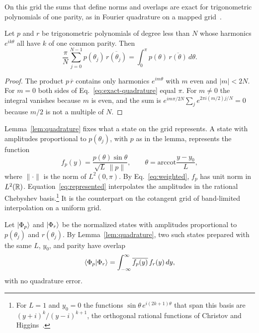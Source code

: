 On this grid the sums that define norms and overlaps are exact for
trigonometric polynomials of one parity, as in Fourier quadrature
on a mapped grid~\cite{Boyd1987}.

\begin{lemma}
	\label{lem:quadrature}
	Let $p$ and $r$ be trigonometric polynomials of degree less than
	$N$ whose harmonics $e^{ik\theta}$ all have $k$ of one common
	parity.  Then
	\begin{equation}
		\frac{\pi}{N}\sum_{j=0}^{N-1}p(\theta_j)\,\overline{r(\theta_j)}
		=\int_0^\pi p(\theta)\,\overline{r(\theta)}\,d\theta .
		\label{eq:exact-quadrature}
	\end{equation}
\end{lemma}

\begin{proof}
	The product $p\,\overline{r}$ contains only harmonics
	$e^{im\theta}$ with $m$ even and $|m|<2N$.  For $m=0$ both sides
	of Eq.~\eqref{eq:exact-quadrature} equal $\pi$.  For $m\neq0$
	the integral vanishes because $m$ is even, and the sum is
	$e^{im\pi/2N}\sum_j e^{2\pi i(m/2)j/N}=0$ because $m/2$ is not a
	multiple of $N$.
\end{proof}

Lemma~\ref{lem:quadrature} fixes what a state on the grid
represents.  A state with amplitudes proportional to $p(\theta_j)$,
with $p$ as in the lemma, represents the function
\begin{equation}
	f_p(y)=\frac{p(\theta)\sin\theta}{\sqrt{L}\,\|p\|},
	\qquad \theta=\mathrm{arccot}\frac{y-y_0}{L},
	\label{eq:represented}
\end{equation}
where $\|\cdot\|$ is the norm of $L^2(0,\pi)$.  By
Eq.~\eqref{eq:weighted}, $f_p$ has unit norm in $L^2(\mathbb{R})$.
Equation~\eqref{eq:represented} interpolates the
amplitudes in the rational Chebyshev basis.\footnote{For $L=1$ and
	$y_0=0$ the functions $\sin\theta\,e^{i(2k+1)\theta}$ that span
	this basis are $(y+i)^k/(y-i)^{k+1}$, the orthogonal rational
	functions of Christov and Higgins~\cite{Boyd1990}.}  It is the
counterpart
on the cotangent grid of band-limited interpolation on a uniform
grid.

Let $\ket{\Phi_p}$ and $\ket{\Phi_r}$ be the normalized states with
amplitudes proportional to $p(\theta_j)$ and $r(\theta_j)$.  By
Lemma~\ref{lem:quadrature}, two such states prepared with the same
$L$, $y_0$, and parity have overlap
\begin{equation}
	\braket{\Phi_p|\Phi_r}
	=\int_{-\infty}^{\infty}\overline{f_p(y)}\,f_r(y)\,dy ,
	\label{eq:quadrature}
\end{equation}
with no quadrature error.


